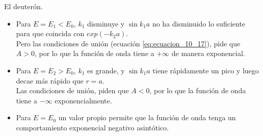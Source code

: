 \begin{ejemplo}{El deuterón.}
\begin{figure}[!h]
\end{figure}
\begin{itemize}
\item Para $E = E_{1} < E_{0}$, $k_{1}$ disminuye y $\sin k_{1} a$  no ha disminuido lo suficiente para que coincida con $exp(-k_{2} a)$. 
\\
Pero las condiciones de unión (ecuación \ref{eq:ecuacion_10_17}), pide que $A > 0$, por lo que la función de onda tiene a $+\infty$ de manera exponencial.
\item Para $E = E_{2} > E_{0}$, $k_{1}$ es grande,  y $\sin k_{1} a$ tiene rápidamente un pico y luego decae más rápido que $r = a$.
\\
Las condiciones de unión, piden que $A < 0$, por lo que la función de onda tiene a $-\infty$ exponencialmente.
\item Para $E = E_{0}$ un valor propio permite que la función de onda tenga un comportamiento exponencial negativo asintótico.
\end{itemize}
\end{ejemplo}

